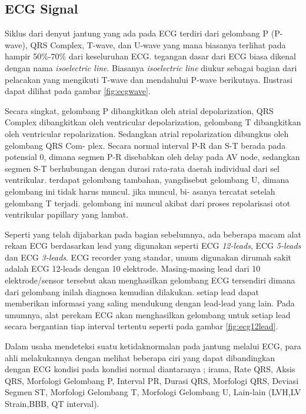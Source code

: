 
\subsection{ECG Signal} 
Siklus dari denyut jantung yang ada pada ECG terdiri dari gelombang P (P-wave),
QRS Complex, T-wave, dan U-wave yang mana biasanya terlihat pada hampir
50\%-70\% dari keseluruhan ECG. tegangan dasar dari ECG biasa dikenal dengan
nama \textit{isoelectric line}. Biasanya  \textit{isoelectric line} diukur
sebagai bagian dari pelacakan yang mengikuti T-wave dan mendahului P-wave
berikutnya. Ilustrasi dapat dilihat pada gambar \ref{fig:ecgwave}.



Secara singkat, gelombang P dibangkitkan oleh atrial depolarization, QRS Complex
dibangkitkan oleh ventricular depolarization, gelombang T dibangkitkan oleh ventricular
repolarization. Sedangkan atrial repolarization dibungkus oleh gelombang QRS Com-
plex. Secara normal interval P-R dan S-T berada pada potensial 0, dimana segmen
P-R disebabkan oleh delay pada AV node, sedangkan segmen S-T berhubungan dengan
durasi rata-rata daerah individual dari sel ventrikular. terdapat gelombang tambahan,
yangdisebut gelombang U, dimana gelombang ini tidak harus muncul. jika muncul, bi-
asanya tercatat setelah gelombang T terjadi. gelombang ini muncul akibat dari proses
repolarisasi otot ventrikular papillary yang lambat.

Seperti yang telah dijabarkan pada bagian sebelumnya, ada beberapa macam alat
rekam ECG berdasarkan lead yang digunakan seperti ECG \textit{12-leads}, ECG
\textit{5-leads} dan ECG \textit{3-leads}. ECG recorder yang standar, umum
digunakan dirumah sakit adalah ECG 12-leads dengan 10 elektrode. Masing-masing
lead  dari 10 elektrode/sensor tersebut akan menghasilkan gelombang ECG
tersendiri dimana dari gelombang inilah diagnosa kemudian dilakukan. setiap lead
dapat memberikan informasi yang saling mendukung dengan lead-lead yang lain.
Pada umumnya, alat perekam ECG akan menghasilkan gelombang untuk setiap lead
secara bergantian tiap interval tertentu seperti pada gambar
\ref{fig:ecg12lead}.




Dalam usaha mendeteksi suatu ketidaknormalan pada jantung melalui ECG,  para
ahli melakukannya  dengan melihat beberapa ciri yang dapat dibandingkan  dengan
ECG kondisi pada kondisi normal diantaranya ; irama, Rate QRS, Aksis QRS,
Morfologi Gelombang P, Interval PR, Durasi QRS, Morfologi QRS, Deviasi Segmen
ST, Morfologi Gelombang T, Morfologi Gelombang U, Lain-lain (LVH,LV Strain,BBB,
QT interval).

